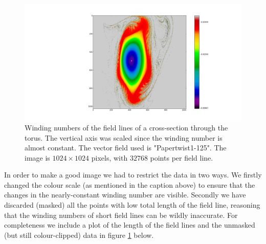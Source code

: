 \documentclass{article}
\begin{document}
\begin{figure}[!htb]
\endminipage\hfill
{}%
  \includegraphics[width=\linewidth]{Figures/Rings_Papertwist_twist1_125_steps32k.png}
  \caption{Winding numbers of the field lines of a cross-section through the torus. The vertical axis was scaled since the winding number is almost constant. The vector field used is "Papertwist1-125". The image is $1024\times 1024$ pixels, with $32768$ points per field line.}\label{fig:125-32k}
\endminipage
\end{figure}

In order to make a good image we had to restrict the data in two ways. We firstly changed the colour scale (as mentioned in the caption above) to ensure that the changes in the nearly-constant winding number are visible. Secondly we have discarded (masked) all the points with low total length of the field line, reasoning that the winding numbers of short field lines can be wildly inaccurate. For completeness we include a plot of the length of the field lines and the unmasked (but still colour-clipped) data in figure \ref{fig:125-32k} below.
\end{document}
